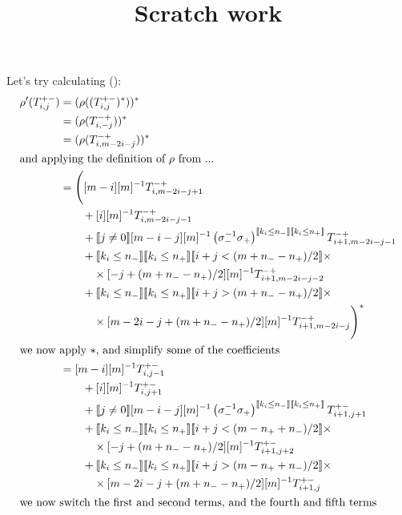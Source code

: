 \documentclass[12pt]{article}
\title{Scratch work}
\begin{document}
\maketitle


Let's try calculating ():
\begin{align*}
\rho'(T^{+-}_{i,j}) & = (\rho((T^{+-}_{i,j})^*))^* \\
                    & = (\rho(T^{-+}_{i,-j}))^* \\
                    & = (\rho(T^{-+}_{i,m-2i-j}))^* \\
\intertext{and applying the definition of $\rho$ from ...}                    
& = 
\Bigg([m-i][m]^{-1} T^{-+}_{i, m-2i-j + 1} \\
& \qquad +
 [i][m]^{-1} T^{-+}_{i,m-2i-j-1} \\
& \qquad +
\truth{j \neq 0} [m-i-j][m]^{-1} \left(\sigma_-^{-1} \sigma_+\right)^{\truth{k_i \leq n_-} \truth{k_i \leq n_+}} T^{-+}_{i+1, m-2i-j-1} \\
& \qquad +
\truth{k_i \leq n_-} \truth{k_i \leq n_+}
\truth{i+j < (m + n_- - n_+)/2} \times \\
& \qquad \quad \times  [-j + (m + n_- - n_+)/2][m]^{-1} T^{-+}_{i+1,m-2i-j-2} \\
& \qquad +
\truth{k_i \leq n_-} \truth{k_i \leq n_+}
\truth{i+j > (m + n_- - n_+)/2} \times \\
& \qquad \quad \times  [m-2i-j+ (m + n_- - n_+)/2 ][m]^{-1} T^{-+}_{i+1,m-2i-j}\Bigg)^* \\
\intertext{we now apply $*$, and simplify some of the coefficients}
& = 
[m-i][m]^{-1} T^{+-}_{i, j-1} \\
& \qquad +
 [i][m]^{-1} T^{+-}_{i,j+1} \\
& \qquad +
\truth{j \neq 0} [m-i-j][m]^{-1} \left(\sigma_-^{-1} \sigma_+\right)^{\truth{k_i \leq n_-} \truth{k_i \leq n_+}} T^{+-}_{i+1, j+1} \\
& \qquad +
\truth{k_i \leq n_-} \truth{k_i \leq n_+}
\truth{i+j < (m - n_+ + n_-)/2} \times \\
& \qquad \quad \times  [-j + (m + n_- - n_+)/2][m]^{-1} T^{+-}_{i+1,j+2} \\
& \qquad +
\truth{k_i \leq n_-} \truth{k_i \leq n_+}
\truth{i+j > (m - n_+ + n_-)/2} \times \\
& \qquad \quad \times [m-2i-j+ (m + n_- - n_+)/2 ][m]^{-1} T^{+-}_{i+1,j} \\
\intertext{we now switch the first and second terms, and the fourth and fifth terms}

\end{align*}
\end{document}
